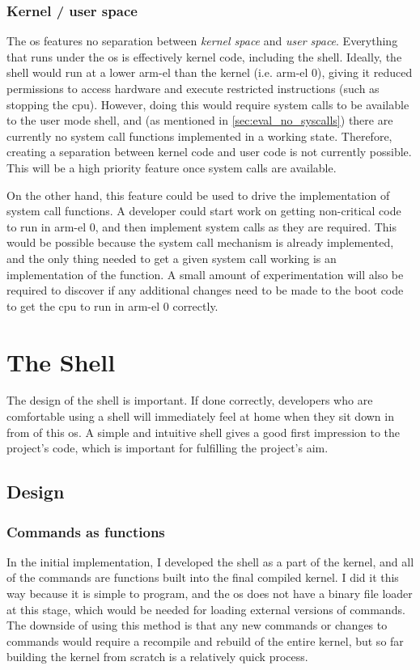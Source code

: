 \documentclass{article}
\begin{document}
\subsubsection{Kernel / user space}
The \gls{os} features no separation between \emph{kernel space} and \emph{user
space}. Everything that runs under the \gls{os} is effectively kernel code,
including the shell. Ideally, the shell would run at a lower \gls{arm-el} than
the kernel (i.e. \gls{arm-el} 0), giving it reduced permissions to access
hardware and execute restricted instructions (such as stopping the \gls{cpu}).
However, doing this would require system calls to be available to the user mode
shell, and (as mentioned in \autoref{sec:eval_no_syscalls}) there are currently
no system call functions implemented in a working state. Therefore, creating a
separation between kernel code and user code is not currently possible. This
will be a high priority feature once system calls are available.

On the other hand, this feature could be used to drive the implementation of
system call functions. A developer could start work on getting non-critical
code to run in \gls{arm-el} 0, and then implement system calls as they are
required. This would be possible because the system call mechanism is already
implemented, and the only thing needed to get a given system call working is an
implementation of the function. A small amount of experimentation will also be
required to discover if any additional changes need to be made to the boot code
to get the \gls{cpu} to run in \gls{arm-el} 0 correctly.

\section{The Shell}
The design of the shell is important. If done correctly, developers who are
comfortable using a shell will immediately feel at home when they sit down in
from of this \gls{os}. A simple and intuitive shell gives a good first
impression to the project's code, which is important for fulfilling the
project's aim.

\subsection{Design}

\subsubsection{Commands as functions}
In the initial implementation, I developed the shell as a part of the kernel,
and all of the commands are functions built into the final compiled kernel. I
did it this way because it is simple to program, and the \gls{os} does not have
a binary file loader at this stage, which would be needed for loading external
versions of commands. The downside of using this method is that any new
commands or changes to commands would require a recompile and rebuild of the
entire kernel, but so far building the kernel from scratch is a relatively
quick process.
\end{document}
